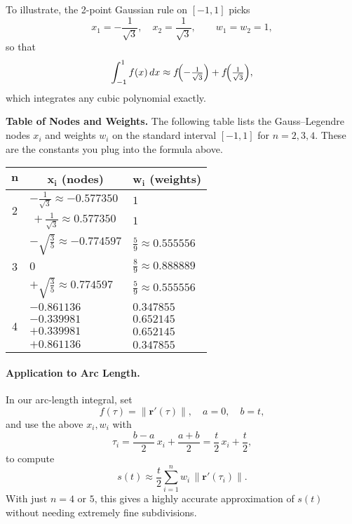 \documentclass[11pt]{article}
\begin{document}
To illustrate, the 2-point Gaussian rule on \([-1,1]\) picks
\[
x_1=-\frac{1}{\sqrt{3}},\quad x_2=\frac{1}{\sqrt{3}},
\qquad
w_1=w_2=1,
\]
so that
\[
\int_{-1}^{1} f(x)\,dx \approx f\!\Bigl(-\tfrac{1}{\sqrt{3}}\Bigr)
             +f\!\Bigl(\tfrac{1}{\sqrt{3}}\Bigr),
\]
which integrates any cubic polynomial exactly.

\bigskip
\noindent\textbf{Table of Nodes and Weights.}%
\quad The following table lists the Gauss–Legendre nodes \(x_i\) and weights \(w_i\) on the standard interval \([-1,1]\) for \(n=2,3,4\). These are the constants you plug into the formula above.

\begin{center}
\begin{tabular}{cll}
\toprule
\multicolumn{1}{c}{\(\boldsymbol{n}\)} & \multicolumn{1}{c}{\(\boldsymbol{x_i}\) (nodes)} 
                                       & \multicolumn{1}{c}{\(\boldsymbol{w_i}\) (weights)} \\
\midrule
\multirow{2}{*}{2} & \(-\tfrac{1}{\sqrt{3}}\approx -0.577350\) & \(1\) \\
                   & \(\,+\tfrac{1}{\sqrt{3}}\approx  0.577350\) & \(1\) \\
\midrule
\multirow{3}{*}{3} & \(-\sqrt{\tfrac{3}{5}}\approx -0.774597\)  & \(\tfrac{5}{9}\approx0.555556\) \\
                   & \(0\)                                       & \(\tfrac{8}{9}\approx0.888889\) \\
                   & \(+\sqrt{\tfrac{3}{5}}\approx  0.774597\)  & \(\tfrac{5}{9}\approx0.555556\) \\
\midrule
\multirow{4}{*}{4} & \(-0.861136\) & \(0.347855\) \\
                   & \(-0.339981\) & \(0.652145\) \\
                   & \(+0.339981\) & \(0.652145\) \\
                   & \(+0.861136\) & \(0.347855\) \\
\bottomrule
\end{tabular}
\end{center}

\paragraph{Application to Arc Length.}%
In our arc-length integral, set 
\[
f(\tau)=\|\mathbf r'(\tau)\|,
\quad
a=0,\quad b=t,
\]
and use the above \(x_i,w_i\) with
\[
\tau_i = \frac{b-a}{2}\,x_i + \frac{a+b}{2}
         = \frac{t}{2}\,x_i + \frac{t}{2},
\]
to compute
\[
s(t) \approx \frac{t}{2}\sum_{i=1}^n w_i\,\|\mathbf r'(\tau_i)\|.
\]
With just \(n=4\) or \(5\), this gives a highly accurate approximation of \(s(t)\) without needing extremely fine subdivisions.
\end{document}
